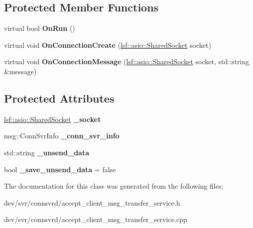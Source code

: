 \subsection*{Protected Member Functions}
\begin{DoxyCompactItemize}
\item 
\hypertarget{classAcceptClientMsgTransferService_aca08eb0240048bb06b0feb9395ad69db}{
virtual bool {\bfseries OnRun} ()}
\label{classAcceptClientMsgTransferService_aca08eb0240048bb06b0feb9395ad69db}

\item 
\hypertarget{classAcceptClientMsgTransferService_a55742c4a8d6c7bce1c6b8f9626a5d28a}{
virtual void {\bfseries OnConnectionCreate} (\hyperlink{classlsf_1_1asio_1_1SharedSocket}{lsf::asio::SharedSocket} socket)}
\label{classAcceptClientMsgTransferService_a55742c4a8d6c7bce1c6b8f9626a5d28a}

\item 
\hypertarget{classAcceptClientMsgTransferService_aa06c5365dd9e91d6adad6b8272a04031}{
virtual void {\bfseries OnConnectionMessage} (\hyperlink{classlsf_1_1asio_1_1SharedSocket}{lsf::asio::SharedSocket} socket, std::string \&message)}
\label{classAcceptClientMsgTransferService_aa06c5365dd9e91d6adad6b8272a04031}

\end{DoxyCompactItemize}
\subsection*{Protected Attributes}
\begin{DoxyCompactItemize}
\item 
\hypertarget{classAcceptClientMsgTransferService_a6c7416af7d475012f238d77eb7a6aaea}{
\hyperlink{classlsf_1_1asio_1_1SharedSocket}{lsf::asio::SharedSocket} {\bfseries \_\-socket}}
\label{classAcceptClientMsgTransferService_a6c7416af7d475012f238d77eb7a6aaea}

\item 
\hypertarget{classAcceptClientMsgTransferService_ab0932591ddbf5a331f7bc9bc76de41f4}{
msg::ConnSvrInfo {\bfseries \_\-conn\_\-svr\_\-info}}
\label{classAcceptClientMsgTransferService_ab0932591ddbf5a331f7bc9bc76de41f4}

\item 
\hypertarget{classAcceptClientMsgTransferService_a9a0ec8df792145bf324e308274e0c915}{
std::string {\bfseries \_\-unsend\_\-data}}
\label{classAcceptClientMsgTransferService_a9a0ec8df792145bf324e308274e0c915}

\item 
\hypertarget{classAcceptClientMsgTransferService_aae03e0c6cfef9b0afbd80cccdc3489af}{
bool {\bfseries \_\-save\_\-unsend\_\-data} = false}
\label{classAcceptClientMsgTransferService_aae03e0c6cfef9b0afbd80cccdc3489af}

\end{DoxyCompactItemize}


The documentation for this class was generated from the following files:\begin{DoxyCompactItemize}
\item 
dev/svr/connsvrd/accept\_\-client\_\-msg\_\-transfer\_\-service.h\item 
dev/svr/connsvrd/accept\_\-client\_\-msg\_\-transfer\_\-service.cpp\end{DoxyCompactItemize}
